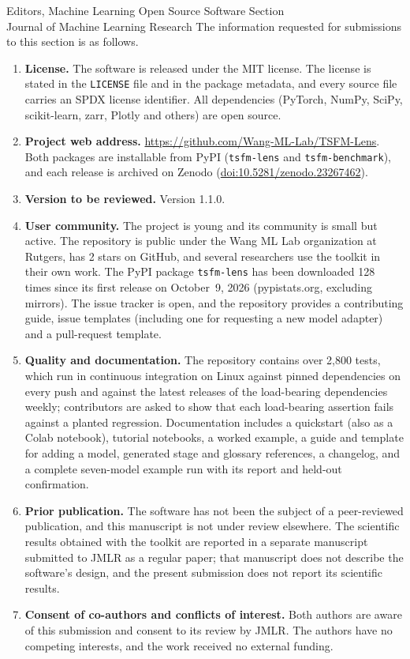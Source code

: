 \documentclass[11pt]{letter}
\begin{document}
\begin{letter}{Editors, Machine Learning Open Source Software Section\\
Journal of Machine Learning Research}
The information requested for submissions to this section is as follows.
\begin{enumerate}
\item \textbf{License.} The software is released under the MIT license. The license is stated in the \texttt{LICENSE}
file and in the package metadata, and every source file carries an SPDX license identifier. All dependencies (PyTorch,
NumPy, SciPy, scikit-learn, zarr, Plotly and others) are open source.
\item \textbf{Project web address.} \url{https://github.com/Wang-ML-Lab/TSFM-Lens}. Both packages are installable from
PyPI (\texttt{tsfm-lens} and \texttt{tsfm-benchmark}), and each release is archived on Zenodo
(\href{https://doi.org/10.5281/zenodo.23267462}{doi:10.5281/zenodo.23267462}).
\item \textbf{Version to be reviewed.} Version 1.1.0.
\item \textbf{User community.} The project is young and its community is small but active. The repository is public
under the Wang ML Lab organization at Rutgers, has 2 stars on GitHub, and several researchers use the toolkit in their
own work. The PyPI package \texttt{tsfm-lens} has been downloaded 128 times since its first release on October~9, 2026
(pypistats.org, excluding mirrors). The issue tracker is open, and the repository provides a contributing guide, issue
templates (including one for requesting a new model adapter) and a pull-request template.
\item \textbf{Quality and documentation.} The repository contains over 2{,}800 tests, which run in continuous
integration on Linux against pinned dependencies on every push and against the latest releases of the load-bearing
dependencies weekly; contributors are asked to show that each load-bearing assertion fails against a planted regression.
Documentation includes a quickstart (also as a Colab notebook), tutorial notebooks, a worked example, a guide and template
for adding a model, generated stage and glossary references, a changelog, and a complete seven-model example run with its
report and held-out confirmation.
\item \textbf{Prior publication.} The software has not been the subject of a peer-reviewed publication, and this
manuscript is not under review elsewhere. The scientific results obtained with the toolkit are reported in a separate
manuscript submitted to JMLR as a regular paper; that manuscript does not describe the software's design, and the
present submission does not report its scientific results.
\item \textbf{Consent of co-authors and conflicts of interest.} Both authors are aware of this submission and consent
to its review by JMLR. The authors have no competing interests, and the work received no external funding.
\end{enumerate}


\end{letter}
\end{document}
